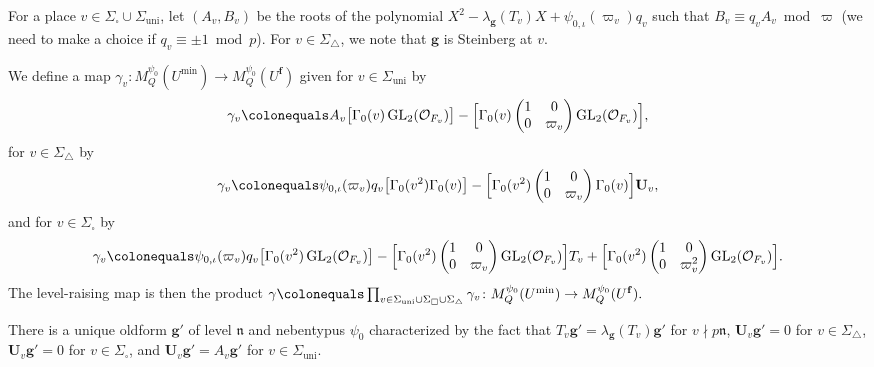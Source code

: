 \documentclass[a4paper, notitlepage, 10pt]{amsart}
\theoremstyle{plain} %
\theoremstyle{definition} %
\theoremstyle{remark} %
\numberwithin{equation}{section}
\newcommand{\GL}{\operatorname{GL}} %
\newcommand{\uni}{\operatorname{uni}}
\begin{document}
For a place $v\in \Sigma_{\square}\cup \Sigma_{\uni}$, let $(A_v,B_v)$ be the roots of the polynomial $X^2-\lambda_{\mathbf{g}}(T_v)X+\psi_{0,\iota}(\varpi_v)q_v$ such that $B_v\equiv q_vA_v \bmod \varpi$ (we need to make a choice if $q_v\equiv \pm1 \bmod p$). For $v\in \Sigma_{\triangle}$, we note that $\mathbf{g}$ is Steinberg at $v$.

We define a map $\gamma_v\colon M^{\psi_0}_Q(U^{\min})\rightarrow M^{\psi_0}_Q(U^{\mathbf{f}})$ given for $v\in \Sigma_{\uni}$ by
$$\gamma_{v}\colonequals A_v\big[\Gamma_0(v) \GL_2(\mathcal{O}_{F_v})\big]-\Big[ \Gamma_0(v) \begin{pmatrix}
    1 & 0 \\ 0 & \varpi_v
\end{pmatrix} 
\GL_2(\mathcal{O}_{F_v})\Big],$$
for $v\in \Sigma_{\triangle}$ by 
$$ \gamma_v\colonequals \psi_{0,\iota}(\varpi_v)q_v \big[ \Gamma_0(v^2)\Gamma_0(v)\big]- \Big[ \Gamma_0(v^2)\begin{pmatrix}
    1 & 0 \\ 0 & \varpi_v
\end{pmatrix}\Gamma_0(v) \Big]\mathbf{U}_v,  $$
and for $v\in \Sigma_{\square}$ by 
$$ 
\gamma_v \colonequals
\psi_{0,\iota}(\varpi_v) q_v
\big[\Gamma_0(v^2)\GL_2(\mathcal{O}_{F_v})\big]
-
\Big[
\Gamma_0(v^2)
\begin{pmatrix}
1 & 0\\
0 & \varpi_v
\end{pmatrix}
\GL_2(\mathcal{O}_{F_v})
\Big] T_v
+
\Big[
\Gamma_0(v^2)
\begin{pmatrix}
1 & 0\\
0 & \varpi_v^2
\end{pmatrix}
\GL_2(\mathcal{O}_{F_v})
\Big]. $$
The level-raising map is then the product 
$ \gamma\colonequals \prod_{v\in \Sigma_{\uni}\cup \Sigma_\square \cup \Sigma_{\triangle}}\gamma_v \colon M^{\psi_0}_Q(U^{\text{min}})\rightarrow M^{\psi_0}_Q(U^{\mathbf{f}}).$ 

There is a unique oldform $\mathbf{g'}$ of level $\mathfrak{n}$ and nebentypus $\psi_0$ characterized by the fact that $T_v\mathbf{g'}=\lambda_{\mathbf{g}}(T_v)\mathbf{g'}$ for $v\nmid p\mathfrak{n}$, $\mathbf{U}_v\mathbf{g'} =0$ for $v\in \Sigma_\triangle$, $\mathbf{U}_v\mathbf{g'}=0$ for $v\in \Sigma_{\square}$, and $\mathbf{U}_v \mathbf{g'}=A_v \mathbf{g'}$ for $v\in \Sigma_{\uni}$. 
\end{document}

